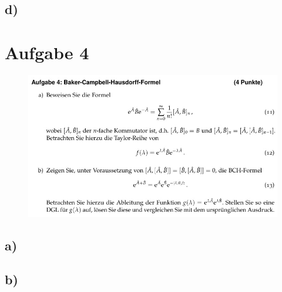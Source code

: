     \subsection{d)}


\section{Aufgabe 4}

    \begin{figure}[H]
        \centering
        \includegraphics[width=\textwidth]{images/Aufgabe4.jpg}
        \label{fig:5}
    \end{figure}

    \subsection{a)}

    \subsection{b)}



